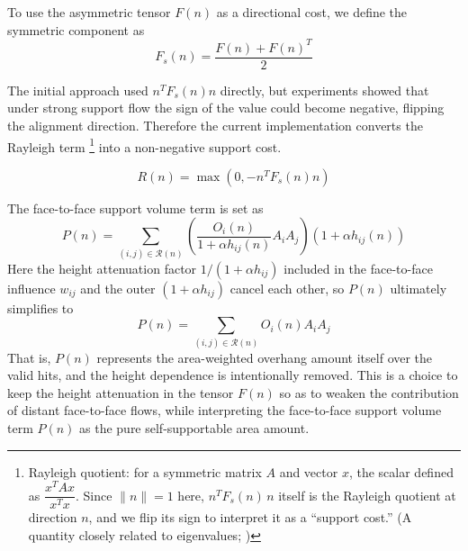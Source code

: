 \documentclass[11pt,a4paper]{article}
\begin{document}
To use the asymmetric tensor $F(n)$ as a directional cost, we define the symmetric component as
\begin{equation}
F_s(n)=\frac{F(n)+F(n)^T}{2}
\end{equation}

The initial approach used $n^TF_s(n)n$ directly, but experiments showed that under strong support flow the sign of the value could become negative,
flipping the alignment direction.
Therefore the current implementation converts the Rayleigh term%
\footnote{Rayleigh quotient: for a symmetric matrix $A$ and vector $x$, the scalar defined as $\dfrac{x^TAx}{x^Tx}$.
Since $\|n\|=1$ here, $n^TF_s(n)\,n$ itself is the Rayleigh quotient at direction $n$,
and we flip its sign to interpret it as a ``support cost.'' (A quantity closely related to eigenvalues; \cite{hornjohnson})}
into a non-negative support cost.

\begin{equation}
R(n)=\max\left(0,-n^TF_s(n)n\right)
\end{equation}

The face-to-face support volume term is set as
\begin{equation}
P(n)
=
\sum_{(i,j)\in\mathcal{R}(n)}
\left(
\frac{O_i(n)}{1+\alpha h_{ij}(n)}A_iA_j
\right)
\left(1+\alpha h_{ij}(n)\right)
\end{equation}
Here the height attenuation factor $1/(1+\alpha h_{ij})$ included in the face-to-face influence $w_{ij}$ and the outer $(1+\alpha h_{ij})$ cancel each other,
so $P(n)$ ultimately simplifies to
\begin{equation}
P(n)
=
\sum_{(i,j)\in\mathcal{R}(n)}
O_i(n)A_iA_j
\end{equation}
That is, $P(n)$ represents the area-weighted overhang amount itself over the valid hits,
and the height dependence is intentionally removed.
This is a choice to keep the height attenuation in the tensor $F(n)$ so as to weaken the contribution of distant face-to-face flows,
while interpreting the face-to-face support volume term $P(n)$ as the pure self-supportable area amount.
\end{document}
